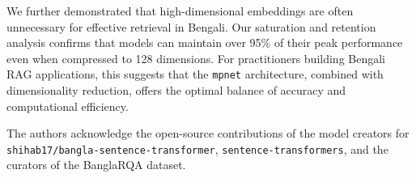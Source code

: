 \documentclass[acmsmall,screen,review]{acmart}
\begin{document}
We further demonstrated that high-dimensional embeddings are often unnecessary for effective retrieval in Bengali. Our saturation and retention analysis confirms that models can maintain over 95\% of their peak performance even when compressed to 128 dimensions. For practitioners building Bengali RAG applications, this suggests that the \texttt{mpnet} architecture, combined with dimensionality reduction, offers the optimal balance of accuracy and computational efficiency.

\begin{acks}
The authors acknowledge the open-source contributions of the model creators for \texttt{shihab17/bangla-sentence-transformer}, \texttt{sentence-transformers}, and the curators of the BanglaRQA dataset.
\end{acks}


    



    
\end{document}
